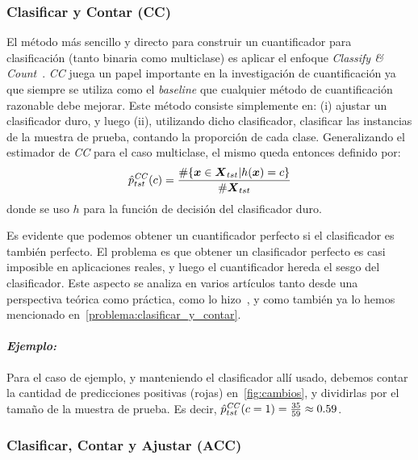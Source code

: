 \subsubsection{Clasificar y Contar (CC)}\label{puntual:cc}

El método más sencillo y directo para construir un cuantificador para
clasificación (tanto binaria como multiclase) es aplicar el enfoque {\it
Classify \& Count\/}~\cite{forman2005counting}. {\it CC\/} juega un papel
importante en la investigación de cuantificación ya que siempre se utiliza como
el {\it baseline\/} que cualquier método de cuantificación razonable debe
mejorar. Este método consiste simplemente en: (i) ajustar un clasificador duro,
y luego (ii), utilizando dicho clasificador, clasificar las instancias de la
muestra de prueba, contando la proporción de cada clase. Generalizando el
estimador de {\it CC\/} para el caso multiclase, el mismo queda entonces
definido por:
\begin{equation}
    \hat p^{\it{CC}}_{tst}(c) = \frac{\#\{\boldsymbol{x} \in \boldsymbol{X}_{tst}|h(\boldsymbol{x})=c\}}{\#\boldsymbol{X}_{tst}}\label{ecuacion:cc}
\end{equation}
donde se uso $h$ para la función de decisión del clasificador duro.

Es evidente que podemos obtener un cuantificador perfecto si el clasificador es
también perfecto. El problema es que obtener un clasificador perfecto es casi
imposible en aplicaciones reales, y luego el cuantificador hereda el sesgo del
clasificador. Este aspecto se analiza en varios artículos tanto desde una
perspectiva teórica como práctica, como lo hizo~\citet{forman2008quantifying}, y
como también ya lo hemos mencionado en~\ref{problema:clasificar_y_contar}.

\paragraph{\it Ejemplo:\/} Para el caso de ejemplo, y manteniendo el
clasificador allí usado, debemos contar la cantidad de predicciones positivas
(rojas) en~\ref{fig:cambios}, y dividirlas por el tamaño de la muestra de
prueba. Es decir, $\hat p^{\it{CC}}_{tst}(c=1) = \frac{35}{59} \approx 0.59$.

\subsubsection{Clasificar, Contar y Ajustar (ACC)}\label{puntual:acc}

